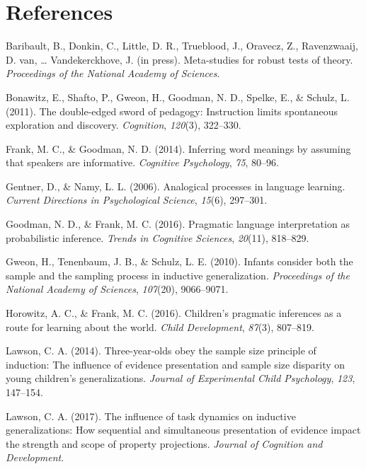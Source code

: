 \documentclass[english,floatsintext,man]{apa6}
\theoremstyle{definition}
\theoremstyle{definition}
\theoremstyle{remark}
\begin{document}
\newpage

\section{References}\label{references}

\setlength{\parindent}{-0.5in} \setlength{\leftskip}{0.5in}

\hypertarget{refs}{}
\hypertarget{ref-baribault2018}{}
Baribault, B., Donkin, C., Little, D. R., Trueblood, J., Oravecz, Z.,
Ravenzwaaij, D. van, \ldots{} Vandekerckhove, J. (in press).
Meta-studies for robust tests of theory. \emph{Proceedings of the
National Academy of Sciences}.

\hypertarget{ref-bonawitz2011}{}
Bonawitz, E., Shafto, P., Gweon, H., Goodman, N. D., Spelke, E., \&
Schulz, L. (2011). The double-edged sword of pedagogy: Instruction
limits spontaneous exploration and discovery. \emph{Cognition},
\emph{120}(3), 322--330.

\hypertarget{ref-frank2014}{}
Frank, M. C., \& Goodman, N. D. (2014). Inferring word meanings by
assuming that speakers are informative. \emph{Cognitive Psychology},
\emph{75}, 80--96.

\hypertarget{ref-gentner2006}{}
Gentner, D., \& Namy, L. L. (2006). Analogical processes in language
learning. \emph{Current Directions in Psychological Science},
\emph{15}(6), 297--301.

\hypertarget{ref-goodman2016}{}
Goodman, N. D., \& Frank, M. C. (2016). Pragmatic language
interpretation as probabilistic inference. \emph{Trends in Cognitive
Sciences}, \emph{20}(11), 818--829.

\hypertarget{ref-gweon2010}{}
Gweon, H., Tenenbaum, J. B., \& Schulz, L. E. (2010). Infants consider
both the sample and the sampling process in inductive generalization.
\emph{Proceedings of the National Academy of Sciences}, \emph{107}(20),
9066--9071.

\hypertarget{ref-horowitz2016}{}
Horowitz, A. C., \& Frank, M. C. (2016). Children's pragmatic inferences
as a route for learning about the world. \emph{Child Development},
\emph{87}(3), 807--819.

\hypertarget{ref-lawson2014three}{}
Lawson, C. A. (2014). Three-year-olds obey the sample size principle of
induction: The influence of evidence presentation and sample size
disparity on young children's generalizations. \emph{Journal of
Experimental Child Psychology}, \emph{123}, 147--154.

\hypertarget{ref-lawson2017influence}{}
Lawson, C. A. (2017). The influence of task dynamics on inductive
generalizations: How sequential and simultaneous presentation of
evidence impact the strength and scope of property projections.
\emph{Journal of Cognition and Development}.
\end{document}
